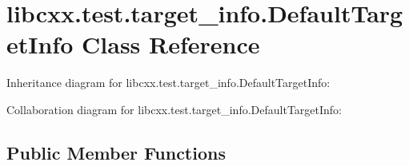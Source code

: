 \hypertarget{classlibcxx_1_1test_1_1target__info_1_1_default_target_info}{}\section{libcxx.\+test.\+target\+\_\+info.\+Default\+Target\+Info Class Reference}
\label{classlibcxx_1_1test_1_1target__info_1_1_default_target_info}


Inheritance diagram for libcxx.\+test.\+target\+\_\+info.\+Default\+Target\+Info\+:


Collaboration diagram for libcxx.\+test.\+target\+\_\+info.\+Default\+Target\+Info\+:
\subsection*{Public Member Functions}
